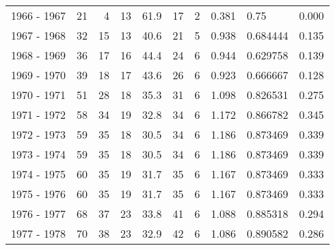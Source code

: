 \begin{tabular}{lrrrrrrrlr}
1966 - 1967 &       21 &        4 &                13 &              61.9 &                      17 &                          2 &       0.381 &       0.75 &             0.000 \\
1967 - 1968 &       32 &       15 &                13 &              40.6 &                      21 &                          5 &       0.938 &   0.684444 &             0.135 \\
1968 - 1969 &       36 &       17 &                16 &              44.4 &                      24 &                          6 &       0.944 &   0.629758 &             0.139 \\
1969 - 1970 &       39 &       18 &                17 &              43.6 &                      26 &                          6 &       0.923 &   0.666667 &             0.128 \\
1970 - 1971 &       51 &       28 &                18 &              35.3 &                      31 &                          6 &       1.098 &   0.826531 &             0.275 \\
1971 - 1972 &       58 &       34 &                19 &              32.8 &                      34 &                          6 &       1.172 &   0.866782 &             0.345 \\
1972 - 1973 &       59 &       35 &                18 &              30.5 &                      34 &                          6 &       1.186 &   0.873469 &             0.339 \\
1973 - 1974 &       59 &       35 &                18 &              30.5 &                      34 &                          6 &       1.186 &   0.873469 &             0.339 \\
1974 - 1975 &       60 &       35 &                19 &              31.7 &                      35 &                          6 &       1.167 &   0.873469 &             0.333 \\
1975 - 1976 &       60 &       35 &                19 &              31.7 &                      35 &                          6 &       1.167 &   0.873469 &             0.333 \\
1976 - 1977 &       68 &       37 &                23 &              33.8 &                      41 &                          6 &       1.088 &   0.885318 &             0.294 \\
1977 - 1978 &       70 &       38 &                23 &              32.9 &                      42 &                          6 &       1.086 &   0.890582 &             0.286 \\

\end{tabular}
